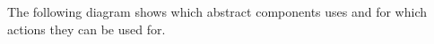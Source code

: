 \label{overviewabstcomp}
The following diagram shows which abstract components \gd{} uses and for which actions they can be used for.  



